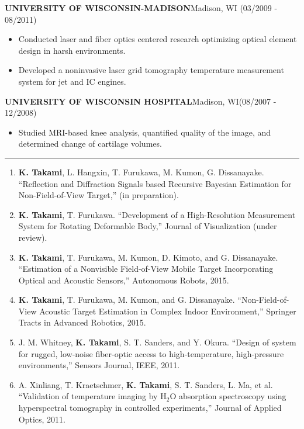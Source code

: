 \documentclass[11pt,letterpaper]{article}
\newcommand{\sect}[1]{\vspace{8mm}{\centering {\bf \large \scshape \uppercase{#1}} \par}  {\color{blue} \vskip 2mm \hrule height 1pt}\vspace{2mm}}
\begin{document}
  \MakeUppercase{\bf University of Wisconsin-Madison}\hfill{Madison, WI}{ (03/2009 - 08/2011)}\\
  \begin{itemize}
  \item Conducted laser and fiber optics centered research optimizing optical element design in harsh environments.
  \item Developed a noninvasive laser grid tomography temperature measurement system for jet and IC engines.
  \end{itemize}

  \MakeUppercase{\bf University of Wisconsin Hospital}\hfill{Madison, WI}{ {(08/2007 - 12/2008)}}\\
  \begin{itemize}
  \item Studied MRI-based knee analysis, quantified quality of the image, and determined change of cartilage volumes.
  \end{itemize}


\pagebreak
\sect{Journal Papers}
  \begin{enumerate}
  \item {\bf K. Takami}, L. Hangxin, T. Furukawa, M. Kumon, G. Dissanayake. ``Reflection and Diffraction Signals based Recursive Bayesian Estimation for Non-Field-of-View Target,'' (in preparation).

  \item {\bf K. Takami}, T. Furukawa. ``Development of a High-Resolution Measurement System for Rotating Deformable Body,'' Journal of Visualization (under review).

  \item {\bf K. Takami}, T. Furukawa, M. Kumon, D. Kimoto, and G. Dissanayake. ``Estimation of a Nonvisible Field-of-View Mobile Target Incorporating Optical and Acoustic Sensors,'' Autonomous Robots, 2015.

  \item {\bf K. Takami}, T. Furukawa, M. Kumon, and G. Dissanayake. ``Non-Field-of-View Acoustic Target Estimation in Complex Indoor Environment,'' Springer Tracts in Advanced Robotics, 2015.

  \item J. M. Whitney, {\bf K. Takami}, S. T. Sanders, and Y. Okura. ``Design of system for rugged, low-noise fiber-optic access to high-temperature, high-pressure environments,'' Sensors Journal, IEEE, 2011.

  \item A. Xinliang, T. Kraetschmer, {\bf K. Takami}, S. T. Sanders, L. Ma, et al. ``Validation of temperature imaging by H$_2$O absorption spectroscopy using hyperspectral tomography in controlled experiments,'' Journal of Applied Optics, 2011.
\end{enumerate}
\end{document}
